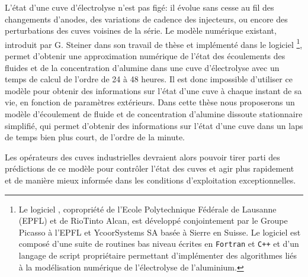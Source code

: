 L'état d'une cuve d'électrolyse n'est pas figé: il évolue sans cesse
au fil des changements d'anodes, des variations de cadence des
injecteurs, ou encore des perturbations des cuves voisines de la
série. Le modèle numérique existant, introduit par G. Steiner dans son
travail de thèse \cite{Steiner2009} et implémenté dans le logiciel
\alucell\footnote{Le logiciel \alucell, copropriété de l'Ecole
  Polytechnique Fédérale de Lausanne (EPFL) et de RioTinto Alcan, est
  développé conjointement par le Groupe Picasso à l'EPFL et
  YcoorSystems SA basée à Sierre en Suisse. Le logiciel \alucell est
  composé d'une suite de routines bas niveau écrites en
  \texttt{Fortran} et \texttt{C++} et d'un langage de script
  propriétaire permettant d'implémenter des algorithmes liés à la
  modélisation numérique de l'électrolyse de l'aluminium.}, permet
d'obtenir une approximation numérique de l'état des écoulements des
fluides et de la concentration d'alumine dans une cuve d'électrolyse
avec un temps de calcul de l'ordre de \num{24} à \num{48} heures. Il
est donc impossible d'utiliser ce modèle pour obtenir des informations
sur l'état d'une cuve à chaque instant de sa vie, en fonction de
paramètres extérieurs. Dans cette thèse nous proposerons un modèle
d'écoulement de fluide et de concentration d'alumine dissoute
stationnaire simplifié, qui permet d'obtenir des informations sur
l'état d'une cuve dans un laps de temps bien plus court, de l'ordre de
la minute.

Les opérateurs des cuves industrielles devraient alors pouvoir tirer
parti des prédictions de ce modèle pour contrôler l'état des cuves
et agir plus rapidement et de manière mieux informée dans les
conditions d'exploitation exceptionnelles.
